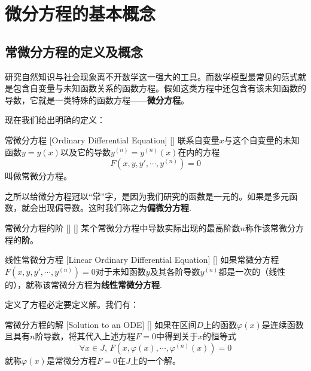 \documentclass[UTF8]{ctexart}
\begin{document}
\tableofcontents
\newpage

\section{微分方程的基本概念}

    \subsection{常微分方程的定义及概念}

        研究自然知识与社会现象离不开数学这一强大的工具。而数学模型最常见的范式就是包含自变量与未知函数关系的函数方程。假如这类方程中还包含有该未知函数的导数，它就是一类特殊的函数方程——\textbf{微分方程}。

        现在我们给出明确的定义：
        \begin{dfn}
            []
            {常微分方程}
            [Ordinary Differential Equation]
            []
            联系自变量$x$与这个自变量的未知函数$y=y(x)$以及它的导数$y^{(n)}=y^{(n)}(x)$在内的方程
            \[F(x,y,y',\cdots,y^{(n)})=0\]
            叫做常微分方程。
        \end{dfn}

        之所以给微分方程冠以“常”字，是因为我们研究的函数是一元的。如果是多元函数，就会出现偏导数。这时我们称之为\textbf{偏微分方程}.

        \begin{dfn}
            []
            {常微分方程的阶}
            []
            []
            某个常微分方程中导数实际出现的最高阶数$n$称作该常微分方程的\textbf{阶}。
        \end{dfn}

        \begin{dfn}
            []
            {线性常微分方程}
            [Linear Ordinary Differential Equation]
            []
            如果常微分方程$F(x,y,y',\cdots,y^{(n)})=0$对于未知函数$y$及其各阶导数$y^{(n)}$都是一次的（线性的），就称该常微分方程为\textbf{线性常微分方程}.
        \end{dfn}

        定义了方程必定要定义解。我们有：

        \begin{dfn}
            []
            {常微分方程的解}
            [Solution to an ODE]
            []
            如果在区间$D$上的函数$\varphi(x)$是连续函数且具有$n$阶导数，将其代入上述方程$F=0$中得到关于$x$的恒等式
            \[\forall x\in J,\,F(x,\varphi(x),\cdots,\varphi^{(n)}(x))=0\]
            就称$\varphi(x)$是常微分方程$F=0$在$J$上的一个解。
        \end{dfn}
\end{document}
